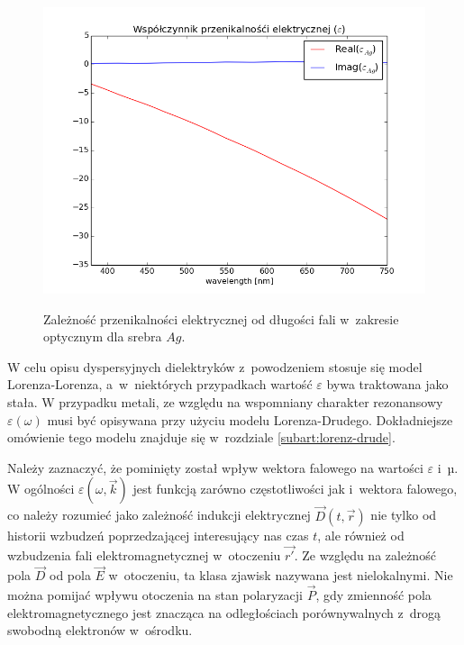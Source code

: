 \begin{figure}[tb]
	\includegraphics[width=\textwidth]{images/agtio2eps.png}
	\label{fig:agtio2eps}
	\caption{Zależność przenikalności elektrycznej od długości fali w~zakresie optycznym dla srebra $Ag$\cite{PhysRevB.6.4370}. }  
\end{figure}
W celu opisu dyspersyjnych dielektryków z~powodzeniem stosuje się model Lorenza-Lorenza, a~w~niektórych przypadkach wartość $\varepsilon$ bywa traktowana jako stała. W przypadku metali, ze względu na wspomniany charakter rezonansowy $\varepsilon(\omega)$  musi być opisywana przy użyciu modelu Lorenza-Drudego. Dokładniejsze omówienie tego modelu znajduje się w~rozdziale \ref{subart:lorenz-drude}.

Należy zaznaczyć, że pominięty został wpływ wektora falowego na wartości $\varepsilon$ i~µ. W ogólności $\varepsilon(\omega,\vec{k})$ jest funkcją zarówno częstotliwości jak i~wektora falowego, co należy rozumieć jako zależność indukcji elektrycznej $\vec{D}(t,\vec{r})$ nie tylko od historii wzbudzeń poprzedzającej interesujący nas czas $t$, ale również od wzbudzenia fali elektromagnetycznej w~otoczeniu $\vec{r'}$. Ze względu na zależność pola $\vec{D}$ od pola $\vec{E}$ w~otoczeniu, ta klasa zjawisk nazywana jest nielokalnymi. Nie można pomijać wpływu otoczenia na stan polaryzacji $\vec{P}$, gdy zmienność pola elektromagnetycznego jest znacząca na odległościach porównywalnych z~drogą swobodną elektronów w~ośrodku.




